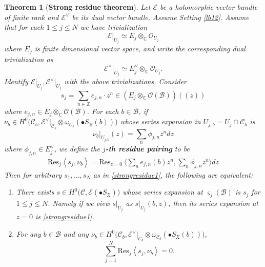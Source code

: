 \documentclass[11pt,b5paper,notitlepage]{article}
\theoremstyle{definition}
\theoremstyle{plain}
\newtheorem{thm}[df]{Theorem}
\newcommand{\mc}{\mathcal}
\newcommand{\Res}{\mathrm{Res}}
\newcommand{\scr}{\mathscr}
\newcommand{\blt}{\bullet}
\newcommand{\Cbb}{\mathbb C}
\newcommand{\Zbb}{\mathbb Z}
\newcommand{\<}{\left\langle}
\renewcommand{\>}{\right\rangle}
\newcommand{\MO}{\mathcal{O}}
\newcommand{\MC}{\mathcal{C}}
\newcommand{\MB}{\mathcal{B}}
\newcommand{\fx}{\mathfrak{X}}
\newcommand{\Bigbk}[1]{\Big\langle {#1}\Big\rangle}
\numberwithin{equation}{subsection}
\begin{document}
\begin{thm}[\textbf{Strong residue theorem}] \label{strongresidue} \label{lb88}
 Let $\scr E$ be a holomorphic vector bundle of finite rank and $\scr E^\vee$ be its dual vector bundle. Assume Setting \ref{lb12}. Assume that for each $1\leq j\leq N$ we have trivialization
    \begin{equation}\label{strongresidue2}
    \scr E\vert_{U_j}\simeq E_j\otimes_\Cbb \MO_{U_j}
    \end{equation}
where $E_j$ is finite dimensional vector space, and write the corresponding dual trivialization as
    \begin{equation}\label{strongresidue3}
    \scr E^{\vee}\vert_{U_j}\simeq E_j^\vee\otimes_\Cbb \MO_{U_j}.
    \end{equation}
Identify $\scr E\vert_{U_j},\scr E^\vee\vert_{U_j}$ with the above trivializations. Consider
    \begin{equation}\label{strongresidue1}
    s_j=\sum_{n\in \Zbb}e_{j,n}\cdot z^n\in (E_j\otimes_\Cbb \MO(\MB))((z))
    \end{equation}
where $e_{j,n}\in E_j\otimes_\Cbb\mc O(\mc B)$.  For each $b\in \MB$, if $\nu_b\in H^0\big(\MC_b,\scr E^\vee\vert_{\MC_b}\otimes \omega_{\MC_b}(\blt S_\fx(b))\big)$ whose series expansion in $U_{j,b}=U_j\cap \MC_b$ is 
    $$
    \nu_b\vert_{U_{j,b}}(z)=\sum_n \phi_{j,n}z^n dz
    $$
    where $\phi_{j,n}\in E_j^\vee$, we define the \textbf{$j$-th residue pairing} to be
\begin{align}
    \Res_j\<s_j,\nu_b\>=\Res_{z=0}~\Bigbk{\sum_n e_{j,n}(b)z^n,\sum_n \phi_{j,n}z^n}dz
\end{align}
Then for arbitrary $s_1,\dots,s_N$ as in \eqref{strongresidue1},  the following are equivalent:
    \begin{enumerate}[label=(\arabic*)]
        \item There exists $s\in H^0\big(\MC,\scr E(\blt S_\fx)\big)$ whose series expansion at $\varsigma_j(\MB)$ is $s_j$ for $1\leq j\leq N$. Namely if we view $s\vert_{U_j}$ as $s\vert_{U_j}(b,z)$, then its series expansion at $z=0$ is \eqref{strongresidue1}.
        \item  For any $b\in \MB$ and any $\nu_b\in H^0\big(\MC_b,\scr E^\vee\vert_{\MC_b}\otimes \omega_{\MC_b}(\blt S_\fx(b))\big)$, 
        $$
        \sum_{j=1}^N \Res_j\<s_j,\nu_b\>=0.
        $$
    \end{enumerate}
\end{thm}
\end{document}

